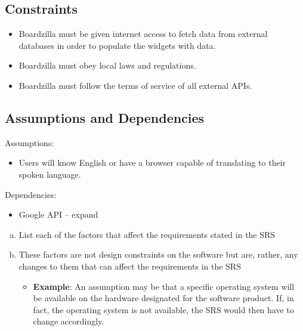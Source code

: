 \documentclass[]{article}
\begin{document}
	\subsection{Constraints}
	\label{sub:constraints}
	\begin{itemize}
		\item Boardzilla must be given internet access to fetch data from external databases in order to populate the widgets with data.
		\item Boardzilla must obey local laws and regulations.
		\item Boardzilla must follow the terms of service of all external APIs.
	\end{itemize}
	
	\subsection{Assumptions and Dependencies}
	\label{sub:assumptions_and_dependencies}
	Assumptions:
	\begin{itemize}
		\item Users will know English or have a browser capable of translating to their spoken language.
	\end{itemize}
	Dependencies:
	\begin{itemize}
		\item Google API -- expand
	\end{itemize}
	\begin{enumerate}[a)]
		\item List each of the factors that affect the requirements stated in the SRS
		\item These factors are not design constraints on the software but are, rather, any changes to them that can affect the requirements in the SRS
		\begin{itemize}
			\item \textbf{Example}: An assumption may be that a specific operating system will be available on the hardware designated for the software product. If, in fact, the operating system is not available, the SRS would then have to change accordingly.
		\end{itemize}
	\end{enumerate}
	
\end{document}
